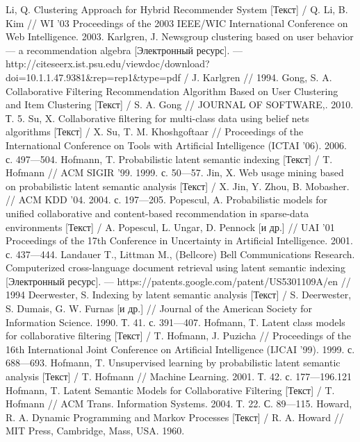 \begin{thebibliography}{119}
 Li, Q. Clustering Approach for Hybrid Recommender System [Текст]  / Q. Li, B. Kim // WI
’03 Proceedings of the 2003 IEEE/WIC International Conference on Web
Intelligence. 2003.
 Karlgren, J. Newsgroup clustering based on user behavior --- a recommendation
algebra [Электронный ресурс]. ---  http://citeseerx.ist.psu.edu/viewdoc/download?doi=10.1.1.47.9381\&rep=rep1\&type=pdf / J. Karlgren // 1994.
 Gong, S. A. Collaborative Filtering Recommendation Algorithm Based on User
Clustering and Item Clustering [Текст]  / S. A. Gong // JOURNAL OF SOFTWARE,. 2010. Т. 5.
 Su, X. Collaborative filtering for multi-class data using belief
nets algorithms [Текст]  / X. Su, T. M. Khoshgoftaar // Proceedings of the International Conference on Tools with
Artificial Intelligence (ICTAI ’06). 2006. с. 497---504.
 Hofmann, T. Probabilistic latent semantic indexing [Текст]  / T. Hofmann // ACM SIGIR ’99. 1999.
с. 50---57.
 Jin, X. Web usage mining based on probabilistic latent
semantic analysis  [Текст] / X. Jin, Y. Zhou, B. Mobasher. // ACM KDD ’04. 2004. с. 197---205.
 Popescul, A. Probabilistic models for unified collaborative and content-based recommendation
in sparse-data environments [Текст]  / A. Popescul, L. Ungar, D. Pennock [и др.] // UAI
’01 Proceedings of the 17th Conference in Uncertainty in Artificial Intelligence.
2001. с. 437---444.
 Landauer T., Littman M., (Bellcore) Bell Communications Research.
Computerized cross-language document retrieval using latent semantic indexing
[Электронный ресурс]. ---  https://patents.google.com/patent/US5301109A/en // 1994
 Deerwester, S. Indexing by latent semantic analysis [Текст]  / S. Deerwester, S. Dumais, G. W. Furnas
[и др.] // Journal of the American Society for Information Science. 1990. Т. 41.
с. 391---407.
 Hofmann, T. Latent class models for collaborative filtering [Текст]  / T. Hofmann, J. Puzicha //
Proceedings of the 16th International Joint Conference on Artificial Intelligence
(IJCAI ’99). 1999. с. 688---693.
 Hofmann, T. Unsupervised learning by probabilistic latent semantic analysis [Текст]  / T. Hofmann //
Machine Learning. 2001. Т. 42. с. 177---196.121
 Hofmann, T. Latent Semantic Models for Collaborative Filtering [Текст]  / T. Hofmann // ACM Trans.
Information Systems. 2004. Т. 22. С. 89---115.
 Howard, R. A. Dynamic Programming and Markov Processes [Текст] / R. A. Howard // MIT Press,
Cambridge, Mass, USA. 1960.

\end{thebibliography}
